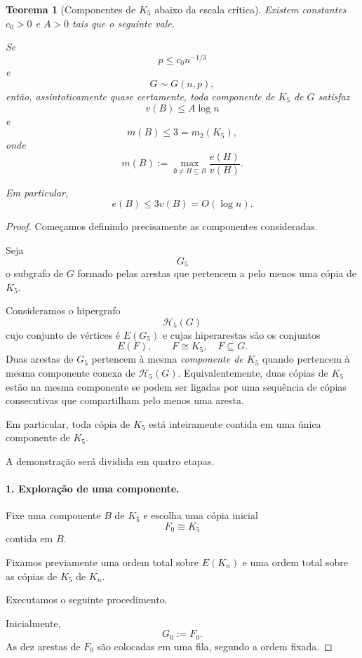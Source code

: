 \documentclass[reqno, 12pt]{amsart}
\numberwithin{equation}{section}
\theoremstyle{plain}
\newtheorem{theorem}{Teorema}[section]
\theoremstyle{definition}
\begin{document}
\begin{theorem}[Componentes de $K_5$ abaixo da escala crítica]
  \label{thm:K5-components}
  Existem constantes $c_0>0$ e $A>0$ tais que o seguinte vale.

  Se
  \[
    p\le c_0 n^{-1/3}
  \]
  e
  \[
    G\sim G(n,p),
  \]
  então, assintoticamente quase certamente, toda componente de $K_5$
  de $G$ satisfaz
  \[
    v(B)\le A\log n
  \]
  e
  \[
    m(B)\le 3=m_2(K_5),
  \]
  onde
  \[
    m(B):=
    \max_{\emptyset\neq H\subseteq B}
    \frac{e(H)}{v(H)}.
  \]

  Em particular,
  \[
    e(B)\le 3v(B)=O(\log n).
  \]
\end{theorem}

\begin{proof}
  Começamos definindo precisamente as componentes consideradas.

  Seja
  \[
    G_5
  \]
  o subgrafo de $G$ formado pelas arestas que pertencem a pelo menos
  uma cópia de $K_5$.

  Consideramos o hipergrafo
  \[
    \mathcal H_5(G)
  \]
  cujo conjunto de vértices é $E(G_5)$ e cujas hiperarestas são os
  conjuntos
  \[
    E(F),
    \qquad F\cong K_5,\quad F\subseteq G.
  \]
  Duas arestas de $G_5$ pertencem à mesma \emph{componente de $K_5$}
  quando pertencem à mesma componente conexa de $\mathcal H_5(G)$.
  Equivalentemente, duas cópias de $K_5$ estão na mesma componente se
  podem ser ligadas por uma sequência de cópias consecutivas que
  compartilham pelo menos uma aresta.

  Em particular, toda cópia de $K_5$ está inteiramente contida em uma
  única componente de $K_5$.

  A demonstração será dividida em quatro etapas.

  \paragraph{1. Exploração de uma componente.}

  Fixe uma componente $B$ de $K_5$ e escolha uma cópia inicial
  \[
    F_0\cong K_5
  \]
  contida em $B$.

  Fixamos previamente uma ordem total sobre $E(K_n)$ e uma ordem total
  sobre as cópias de $K_5$ de $K_n$.

  Executamos o seguinte procedimento.

  Inicialmente,
  \[
    G_0:=F_0.
  \]
  As dez arestas de $F_0$ são colocadas em uma fila, segundo a ordem
  fixada.


\end{proof}
\end{document}
